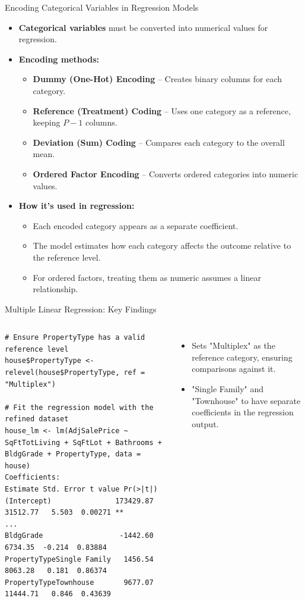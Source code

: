 \documentclass{beamer}
\begin{document}
	\begin{frame}{Encoding Categorical Variables in Regression Models}
		\begin{itemize}
			\item \textbf{Categorical variables} must be converted into numerical values for regression.
			\item \textbf{Encoding methods:}
			\begin{itemize}
				\item \textbf{Dummy (One-Hot) Encoding} – Creates binary columns for each category.
				\item \textbf{Reference (Treatment) Coding} – Uses one category as a reference, keeping $P - 1$ columns.
				\item \textbf{Deviation (Sum) Coding} – Compares each category to the overall mean.
				\item \textbf{Ordered Factor Encoding} – Converts ordered categories into numeric values.
			\end{itemize}
			\item \textbf{How it’s used in regression:}
			\begin{itemize}
				\item Each encoded category appears as a separate coefficient.
				\item The model estimates how each category affects the outcome relative to the reference level.
				\item For ordered factors, treating them as numeric assumes a linear relationship.
			\end{itemize}
		\end{itemize}
	\end{frame}
	

	\begin{frame}[fragile]{Multiple Linear Regression: Key Findings}
		\begin{columns}
			\begin{lstlisting}
# Ensure PropertyType has a valid reference level
house$PropertyType <- relevel(house$PropertyType, ref = "Multiplex")

# Fit the regression model with the refined dataset
house_lm <- lm(AdjSalePrice ~ SqFtTotLiving + SqFtLot + Bathrooms + BldgGrade + PropertyType, data = house)
Coefficients:
Estimate Std. Error t value Pr(>|t|)   
(Intercept)               173429.87   31512.77   5.503  0.00271 **
...
BldgGrade                  -1442.60    6734.35  -0.214  0.83884   
PropertyTypeSingle Family   1456.54    8063.28   0.181  0.86374   
PropertyTypeTownhouse       9677.07   11444.71   0.846  0.43639 
			\end{lstlisting}
			\begin{itemize}
				\item Sets "Multiplex" as the reference category, ensuring comparisons against it.
				\item "Single Family" and "Townhouse" to have separate coefficients in the regression output.
			\end{itemize}
		\end{columns}
	\end{frame}
\end{document}
